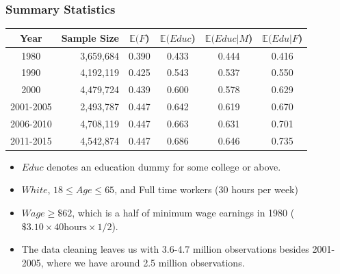 \documentclass[beamer, t]{beamer}
\newcommand{\bit}{\begin{itemize}}
\newcommand{\eit}{\end{itemize}}
\begin{document}
\begin{frame}
\frametitle{Summary Statistics}
	\begin{table}[ht]
		\centering
		\footnotesize
		\begin{tabular}{crcccc}
			\hline
			Year & Sample Size & $\mathbb E(F$) & $\mathbb E(Educ$) & $\mathbb E(Educ|M$) & $\mathbb E(Edu|F$) \\ 
			\hline
			1980      & 3,659,684 & 0.390 & 0.433 & 0.444 & 0.416 \\ 
			1990      & 4,192,119 & 0.425 & 0.543 & 0.537 & 0.550 \\ 
			2000      & 4,479,724 & 0.439 & 0.600 & 0.578 & 0.629 \\ 
			2001-2005 & 2,493,787 & 0.447 & 0.642 & 0.619 & 0.670 \\ 
			2006-2010 & 4,708,119 & 0.447 & 0.663 & 0.631 & 0.701 \\ 
			2011-2015 & 4,542,874 & 0.447 & 0.686 & 0.646 & 0.735 \\ 
			\hline
		\end{tabular}
	\end{table}
	\bit
		\item  $Educ$ denotes an education dummy for some college or above. 

		\item $White$, $18 \le Age \le 65$,  and Full time workers (30 hours per week)

		\item $Wage \ge \$62$, which is a half of minimum wage earnings in 1980 ($\$3.10 \times 40 \mbox{hours} \times 1/2$). 
		
		\item
		The data cleaning leaves us with 3.6-4.7 million observations besides 2001-2005, where we have around 2.5 million observations.
		
	\eit
	

\end{frame}
\end{document}
